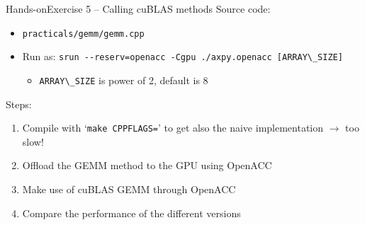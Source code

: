 \documentclass[12pt,aspectratio=169]{beamer}
\newcommand\shinline[2][]{\lstinline[style=shstyle,basicstyle=\ttfamily,#1]!#2!}
\begin{document}


\begin{frame}[fragile]{Hands-on}{Exercise 5 -- Calling cuBLAS methods}
  Source code:
  \begin{itemize}
  \item \shinline{practicals/gemm/gemm.cpp}
  \item Run as: \shinline{srun --reserv=openacc -Cgpu ./axpy.openacc [ARRAY\_SIZE]}
    \begin{itemize}
    \item \shinline{ARRAY\_SIZE} is power of 2, default is 8
    \end{itemize}
  \end{itemize}
  \vfill
  Steps:
  \begin{enumerate}
  \item Compile with `\shinline{make CPPFLAGS=}' to get also the naive implementation $\rightarrow$ too slow!
  \item Offload the GEMM method to the GPU using OpenACC
  \item Make use of cuBLAS GEMM through OpenACC
  \item Compare the performance of the different versions
  \end{enumerate}
\end{frame}
\end{document}
